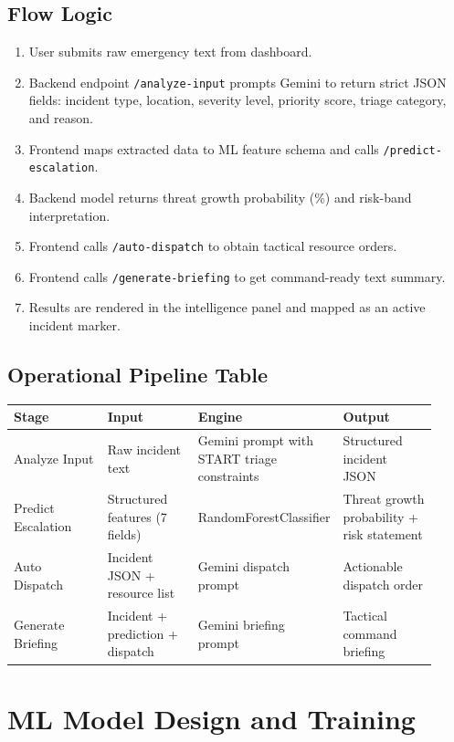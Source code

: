 \documentclass[12pt,a4paper]{article}
\begin{document}
\subsection{Flow Logic}
\begin{enumerate}[leftmargin=1.5em]
  \item User submits raw emergency text from dashboard.
  \item Backend endpoint \texttt{/analyze-input} prompts Gemini to return strict JSON fields:
  incident type, location, severity level, priority score, triage category, and reason.
  \item Frontend maps extracted data to ML feature schema and calls \texttt{/predict-escalation}.
  \item Backend model returns threat growth probability (\%) and risk-band interpretation.
  \item Frontend calls \texttt{/auto-dispatch} to obtain tactical resource orders.
  \item Frontend calls \texttt{/generate-briefing} to get command-ready text summary.
  \item Results are rendered in the intelligence panel and mapped as an active incident marker.
\end{enumerate}

\subsection{Operational Pipeline Table}
\begin{longtable}{p{0.23\linewidth} p{0.22\linewidth} p{0.24\linewidth} p{0.23\linewidth}}
\toprule
\textbf{Stage} & \textbf{Input} & \textbf{Engine} & \textbf{Output} \\
\midrule
Analyze Input & Raw incident text & Gemini prompt with START triage constraints & Structured incident JSON \\
Predict Escalation & Structured features (7 fields) & RandomForestClassifier & Threat growth probability + risk statement \\
Auto Dispatch & Incident JSON + resource list & Gemini dispatch prompt & Actionable dispatch order \\
Generate Briefing & Incident + prediction + dispatch & Gemini briefing prompt & Tactical command briefing \\
\bottomrule
\end{longtable}

\section{ML Model Design and Training}
\end{document}
